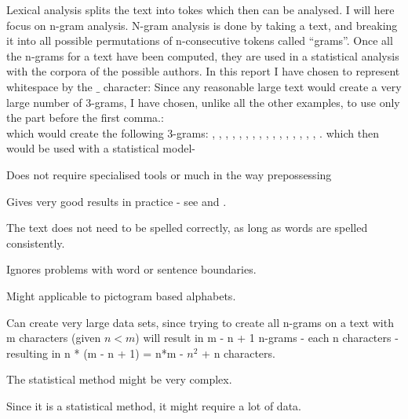 {\label{character}
Lexical analysis splits the text into tokes which then can be analysed. I will here focus on n-gram analysis. N-gram analysis is done by taking a text, and breaking it into all possible permutations of n-consecutive tokens called ``grams''. Once all the n-grams for a text have been computed, they are used in a statistical analysis with the corpora of the possible authors. 
}
{
In this report I have chosen to represent whitespace by the $\_$ character: Since any reasonable large text would create a very large number of 3-grams, I have chosen, unlike all the other examples, to use only the part before the first comma.:\\
which would create the following 3-grams: , , , , , , , , , , , , , , , , .
which then would be used with a statistical model- 
}
{
\item Does not require specialised tools or much in the way prepossessing
\item Gives very good results in practice - see \cite{nr4} and \cite{nr3}.
\item The text does not need to be spelled correctly, as long as words are spelled consistently.
\item Ignores problems with word or sentence boundaries.
\item Might applicable to pictogram based alphabets.  
}
{
\item Can create very large data sets, since trying to create all n-grams on a text with m characters (given $n < m$) will result in m - n + 1 n-grams - each n characters - resulting in n * (m - n + 1) = n*m - $n^2$ + n characters.
\item The statistical method might be very complex.
\item Since it is a statistical method, it might require a lot of data.
}


